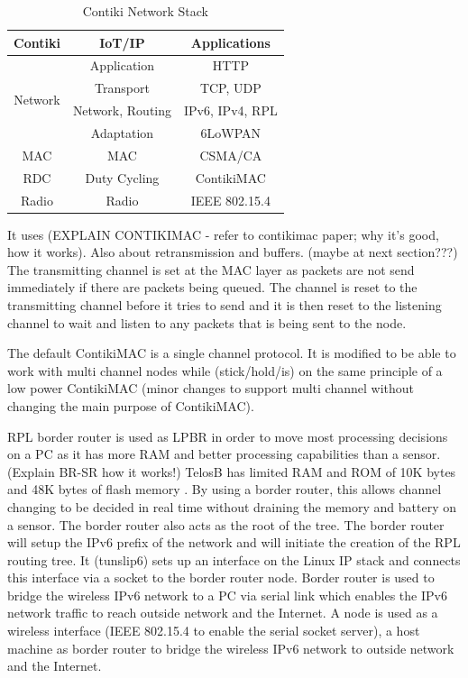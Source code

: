 \begin{table}
  \centering
    \begin{tabular}{|c|c|c|}
      \hline
      Contiki & IoT/IP & Applications \\
      \hline \hline
      \multirow{4}{*}{Network} 
        & Application & HTTP \\
        \cline{2-3}
        & Transport & TCP, UDP \\
        \cline{2-3}
        & Network, Routing & IPv6, IPv4, RPL \\
        \cline{2-3}
        & Adaptation & 6LoWPAN \\
      \hline \hline
      
      MAC & MAC & CSMA/CA \\
      \hline
      RDC & Duty Cycling & ContikiMAC \\
      \hline
      Radio & Radio & IEEE 802.15.4 \\
      \hline
    \end{tabular}
    \caption{Contiki Network Stack}
    \label{table:1}
\end{table}

It uses (EXPLAIN CONTIKIMAC - refer to contikimac paper; why it's good, how it works). Also about retransmission and buffers. (maybe at next section???) The transmitting channel is set at the MAC layer as packets are not send immediately if there are packets being queued. The channel is reset to the transmitting channel before it tries to send and it is then reset to the listening channel to wait and listen to any packets that is being sent to the node. 

The default ContikiMAC is a single channel protocol. It is modified to be able to work with multi channel nodes while (stick/hold/is) on the same principle of a low power ContikiMAC (minor changes to support multi channel without changing the main purpose of ContikiMAC).

RPL border router is used as LPBR in order to move most processing decisions on a PC as it has more RAM and better processing capabilities than a sensor. (Explain BR-SR how it works!)
TelosB has limited RAM and ROM of 10K bytes and 48K bytes of flash memory \cite{telosb-datasheet}. By using a border router, this allows channel changing to be decided in real time without draining the memory and battery on a sensor. The border router also acts as the root of the tree. The border router will setup the IPv6 prefix of the network and will initiate the creation of the RPL routing tree.
It (tunslip6) sets up an interface on the Linux IP stack and connects this interface via a socket to the border router node.
Border router is used to bridge the wireless IPv6 network to a PC via serial link which enables the IPv6 network traffic to reach outside network and the Internet.
A node is used as a wireless interface (IEEE 802.15.4 to enable the serial socket server), a host machine as border router to bridge the wireless IPv6 network to outside network and the Internet.

